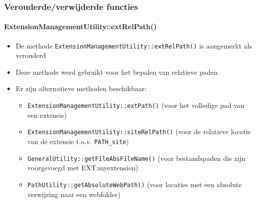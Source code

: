 \begin{frame}[fragile]
	\frametitle{Verouderde/verwijderde functies}
	\framesubtitle{ExtensionManagementUtility::extRelPath()}

	\begin{itemize}

		\item De methode \texttt{ExtensionManagementUtility::extRelPath()} is aangemerkt als verouderd
		\item Deze methode werd gebruikt voor het bepalen van relatieve paden
		\item Er zijn alternatieve methoden beschikbaar:

			\begin{itemize}
				\item \texttt{ExtensionManagementUtility::extPath()}\newline
					(voor het volledige pad van een extensie)
				\item \texttt{ExtensionManagementUtility::siteRelPath()}\newline
					(voor de relatieve locatie van de extensie t.o.v. \texttt{PATH\_site})
				\item \texttt{GeneralUtility::getFileAbsFileName()}\newline
					(voor bestandspaden die zijn voorgevoegd met EXT:myextension)
				\item \texttt{PathUtility::getAbsoluteWebPath()}\newline
					(voor locaties met een absolute verwijzing naar een webfolder)
			\end{itemize}

	\end{itemize}

\end{frame}


